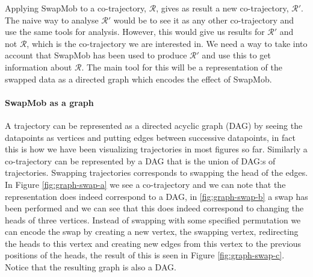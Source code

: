 \documentclass[12pt]{article}
\newcommand{\cotraj}{\mathcal{R}}
\theoremstyle{definition}
\begin{document}
Applying SwapMob to a co-trajectory, \(\cotraj\), gives as result a
new co-trajectory, \(\cotraj'\). The naive way to analyse \(\cotraj'\)
would be to see it as any other co-trajectory and use the same tools
for analysis. However, this would give us results for \(\cotraj'\) and
not \(\cotraj\), which is the co-trajectory we are interested in. We
need a way to take into account that SwapMob has been used to produce
\(\cotraj'\) and use this to get information about \(\cotraj\). The
main tool for this will be a representation of the swapped data as a
directed graph which encodes the effect of SwapMob.

\paragraph{SwapMob as a graph}
A trajectory can be represented as a directed acyclic graph (DAG) by
seeing the datapoints as vertices and putting edges between
successive datapoints, in fact this is how we have been visualizing
trajectories in most figures so far. Similarly a co-trajectory can be
represented by a DAG that is the union of DAG:s of trajectories.
Swapping trajectories corresponds to swapping the head of the edges.
In Figure \ref{fig:graph-swap-a} we see a co-trajectory and we can
note that the representation does indeed correspond to a DAG, in
\ref{fig:graph-swap-b} a swap has been performed and we can see that
this does indeed correspond to changing the heads of three vertices.
Instead of swapping with some specified permutation we can encode the
swap by creating a new vertex, the swapping vertex, redirecting the
heads to this vertex and creating new edges from this vertex to the
previous positions of the heads, the result of this is seen in Figure
\ref{fig:graph-swap-c}. Notice that the resulting graph is also a DAG.
\end{document}
